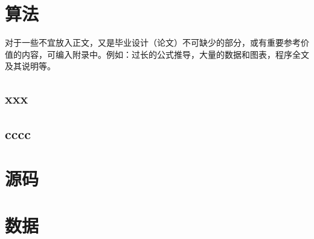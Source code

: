 





\appendix

\chapter{算法} 

对于一些不宜放入正文，又是毕业设计（论文）不可缺少的部分，或有重要参考价值的内容，可编入附录中。例如：过长的公式推导，大量的数据和图表，程序全文及其说明等。

\section{xxx} 

\section{cccc} 

\chapter{源码} 



\chapter{数据} 

